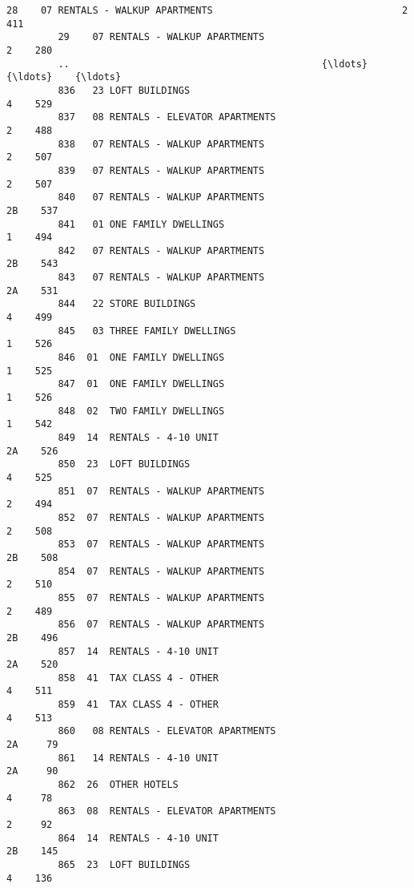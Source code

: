 \documentclass[11pt]{article}
\begin{document}
\begin{Verbatim}[commandchars=\\\{\}]
         28    07 RENTALS - WALKUP APARTMENTS                                 2    411   
         29    07 RENTALS - WALKUP APARTMENTS                                 2    280   
         ..                                            {\ldots}                  {\ldots}    {\ldots}   
         836   23 LOFT BUILDINGS                                              4    529   
         837   08 RENTALS - ELEVATOR APARTMENTS                               2    488   
         838   07 RENTALS - WALKUP APARTMENTS                                 2    507   
         839   07 RENTALS - WALKUP APARTMENTS                                 2    507   
         840   07 RENTALS - WALKUP APARTMENTS                                2B    537   
         841   01 ONE FAMILY DWELLINGS                                        1    494   
         842   07 RENTALS - WALKUP APARTMENTS                                2B    543   
         843   07 RENTALS - WALKUP APARTMENTS                                2A    531   
         844   22 STORE BUILDINGS                                             4    499   
         845   03 THREE FAMILY DWELLINGS                                      1    526   
         846  01  ONE FAMILY DWELLINGS                                        1    525   
         847  01  ONE FAMILY DWELLINGS                                        1    526   
         848  02  TWO FAMILY DWELLINGS                                        1    542   
         849  14  RENTALS - 4-10 UNIT                                        2A    526   
         850  23  LOFT BUILDINGS                                              4    525   
         851  07  RENTALS - WALKUP APARTMENTS                                 2    494   
         852  07  RENTALS - WALKUP APARTMENTS                                 2    508   
         853  07  RENTALS - WALKUP APARTMENTS                                2B    508   
         854  07  RENTALS - WALKUP APARTMENTS                                 2    510   
         855  07  RENTALS - WALKUP APARTMENTS                                 2    489   
         856  07  RENTALS - WALKUP APARTMENTS                                2B    496   
         857  14  RENTALS - 4-10 UNIT                                        2A    520   
         858  41  TAX CLASS 4 - OTHER                                         4    511   
         859  41  TAX CLASS 4 - OTHER                                         4    513   
         860   08 RENTALS - ELEVATOR APARTMENTS                              2A     79   
         861   14 RENTALS - 4-10 UNIT                                        2A     90   
         862  26  OTHER HOTELS                                                4     78   
         863  08  RENTALS - ELEVATOR APARTMENTS                               2     92   
         864  14  RENTALS - 4-10 UNIT                                        2B    145   
         865  23  LOFT BUILDINGS                                              4    136   
         

\end{Verbatim}
\end{document}
